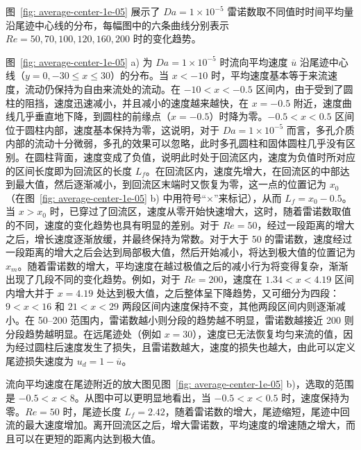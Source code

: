 
图~\ref{fig: average-center-1e-05} 展示了 $Da=1\times 10^{-5}$ 雷诺数取不同值时时间平均量沿尾迹中心线的分布，每幅图中的六条曲线分别表示 $Re=50,70,100,120,160,200$ 时的变化趋势。

图~\ref{fig: average-center-1e-05} a) 为 $Da=1\times 10^{-5}$ 时流向平均速度 $\overline{u}$ 沿尾迹中心线（$y=0, -30\leq x\leq 30$）的分布。当 $x<-10$ 时，平均速度基本等于来流速度，流动仍保持为自由来流处的流动。在 $-10<x<-0.5$ 区间内，由于受到了圆柱的阻挡，速度迅速减小，并且减小的速度越来越快，在 $x=-0.5$ 附近，速度曲线几乎垂直地下降，到圆柱的前缘点（$x=-0.5$）时降为零。$-0.5<x<0.5$ 区间位于圆柱内部，速度基本保持为零，这说明，对于 $Da=1\times 10^{-5}$ 而言，多孔介质内部的流动十分微弱，多孔的效果可以忽略，此时多孔圆柱和固体圆柱几乎没有区别。在圆柱背面，速度变成了负值，说明此时处于回流区内，速度为负值时所对应的区间长度即为回流区的长度 $L_f$。在回流区内，速度先增大，在回流区的中部达到最大值，然后逐渐减小，到回流区末端时又恢复为零，这一点的位置记为 $x_0$（在图~\ref{fig: average-center-1e-05} b) 中用符号“$\times$”来标记），从而 $L_f=x_0-0.5$。当 $x>x_0$ 时，已穿过了回流区，速度从零开始快速增大，这时，随着雷诺数取值的不同，速度的变化趋势也具有明显的差别。对于 $Re=50$，经过一段距离的增大之后，增长速度逐渐放缓，并最终保持为常数。对于大于 50 的雷诺数，速度经过一段距离的增大之后会达到局部极大值，然后开始减小，将达到极大值的位置记为 $x_m$。随着雷诺数的增大，平均速度在越过极值之后的减小行为将变得复杂，渐渐出现了几段不同的变化趋势。例如，对于 $Re=200$，速度在 $1.34<x<4.19$ 区间内增大并于 $x=4.19$ 处达到极大值，之后整体呈下降趋势，又可细分为四段：$9<x<16$ 和 $21<x<29$ 两段区间内速度保持不变，其他两段区间内则逐渐减小。在 50--200 范围内，雷诺数越小则分段的趋势越不明显，雷诺数越接近 200 则分段趋势越明显。在远尾迹处（例如 $x=30$），速度已无法恢复均匀来流的值，因为经过圆柱后速度发生了损失，且雷诺数越大，速度的损失也越大，由此可以定义尾迹损失速度为 $u_d=1-\overline{u}$。

流向平均速度在尾迹附近的放大图见图~\ref{fig: average-center-1e-05} b)，选取的范围是 $-0.5<x<8$。从图中可以更明显地看出，当 $-0.5<x<0.5$ 时，速度保持为零。$Re=50$ 时，尾迹长度 $L_f=2.42$，随着雷诺数的增大，尾迹缩短，尾迹中回流的最大速度增加。离开回流区之后，增大雷诺数，平均速度的增速随之增大，而且可以在更短的距离内达到极大值。

